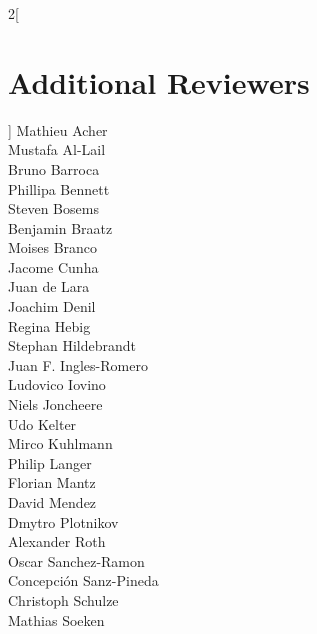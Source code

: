 \begin{multicols}{2}[\section*{Additional Reviewers}]
Mathieu Acher \\
Mustafa Al-Lail \\
Bruno Barroca \\
Phillipa Bennett \\
Steven Bosems \\
Benjamin Braatz \\
Moises Branco \\
Jacome Cunha \\
Juan de Lara \\
Joachim Denil \\
Regina Hebig \\
Stephan Hildebrandt \\
Juan F. Ingles-Romero \\
Ludovico Iovino \\
Niels Joncheere \\
Udo Kelter \\
Mirco Kuhlmann \\
Philip Langer \\
Florian Mantz \\
David Mendez \\
Dmytro Plotnikov \\
Alexander Roth \\
Oscar Sanchez-Ramon \\
Concepci\'{o}n Sanz-Pineda \\
Christoph Schulze \\
Mathias Soeken\end{multicols}